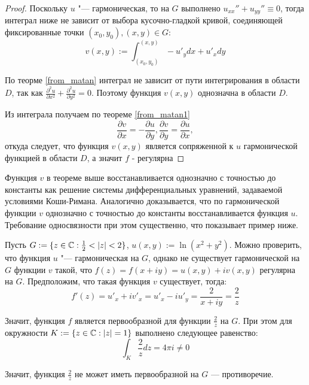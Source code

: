 \begin{proof}
	Поскольку $u$ "--- гармоническая, то на $G$ выполнено $u_{xx}'' + u_{yy}'' \equiv 0$, тогда интеграл ниже не зависит от выбора кусочно-гладкой кривой, соединяющей фиксированные точки $(x_0, y_0), (x, y) \in G$:
	\[v(x, y) := \int_{(x_0, y_0)}^{(x, y)}-u'_ydx + u'_xdy\]
	
	По теорме \ref{from_matan} интеграл не зависит от пути интегрирования в области $D$, так как $\frac{\partial^2u}{\partial{x^2}}+\frac{\partial^2{u}}{\partial{y}^2}=0$. Поэтому функция $v(x,y)$ однозначна в области $D$.
 
        Из интеграла получаем по теореме \ref{from_matan1}
        \[\frac{\partial{v}}{\partial{x}}=-\frac{\partial{u}}{\partial{y}}, \frac{\partial{v}}{\partial{y}}=\frac{\partial{u}}{\partial{x}},\]
    откуда следует, что функция $v(x, y)$ является сопряженной к $u$ гармонической функцией в области $D$, а значит $f$ - регулярна
\end{proof}

\begin{note}
	Функция $v$ в теореме выше восстанавливается однозначно с точностью до константы как решение системы дифференциальных уравнений, задаваемой условиями Коши-Римана. Аналогично доказывается, что по гармонической функции $v$ однозначно с точностью до константы восстанавливается функция $u$. Требование односвязности при этом существенно, что показывает пример ниже.
\end{note}

\begin{unnecessary}
    \begin{example}
    	Пусть $G := \{z \in \mathbb{C} : \frac12 < |z| < 2\}$, $u(x, y) := \ln(x^2 + y^2)$. Можно проверить, что функция $u$ "--- гармоническая на $G$, однако не существует гармонической на $G$ функции $v$ такой, что $f(z) = f(x + iy) = u(x, y) + iv(x, y)$ регулярна на $G$. Предположим, что такая функция $v$ существует, тогда:
    	\[f'(z) = u'_x + iv'_x = u'_x - iu'_y = \frac{2}{x + iy} = \frac 2z\]
    	
    	Значит, функция $f$ является первообразной для функции $\frac 2z$ на $G$. При этом для окружности $K := \{z \in \mathbb{C}: |z| = 1\}$ выполнено следующее равенство:
    	\[\int_{K} \frac 2zdz = 4\pi i \ne 0\]
    	
    	Значит, функция $\frac2z$ не может иметь первообразной на $G$ --- противоречие.
    \end{example}
\end{unnecessary}